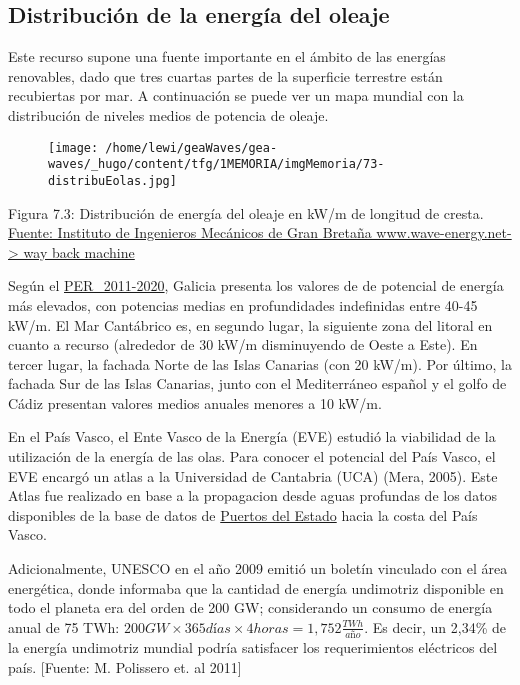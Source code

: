 \subsection{Distribución de la energía del oleaje}\label{header-n47}

Este recurso supone una fuente importante en el ámbito de las energías
renovables, dado que tres cuartas partes de la superficie terrestre
están recubiertas por mar. A continuación se puede ver un mapa mundial
con la distribución de niveles medios de potencia de oleaje.

\begin{figure}
\centering
\texttt{[image: /home/lewi/geaWaves/gea-waves/\_hugo/content/tfg/1MEMORIA/imgMemoria/73-distribuEolas.jpg]}
\caption{}
\end{figure}

Figura 7.3: Distribución de energía del oleaje en kW/m de longitud de
cresta.
\href{https://web.archive.org/web/20060127164948/http://www.wave-energy.net:80/home.htm}{Fuente:
Instituto de Ingenieros Mecánicos de Gran Bretaña
www.wave-energy.net-\textgreater{} way back machine}

Según el
\href{http://www.idae.es/uploads/documentos/documentos_PER_2011-2020_Borrador26julio-I_c53dc770.pdf}{PER\_2011-2020},
Galicia presenta los valores de de potencial de energía más elevados,
con potencias medias en profundidades indefinidas entre 40-45 kW/m. El
Mar Cantábrico es, en segundo lugar, la siguiente zona del litoral en
cuanto a recurso (alrededor de 30 kW/m disminuyendo de Oeste a Este). En
tercer lugar, la fachada Norte de las Islas Canarias (con 20 kW/m). Por
último, la fachada Sur de las Islas Canarias, junto con el Mediterráneo
español y el golfo de Cádiz presentan valores medios anuales menores a
10 kW/m.

En el País Vasco, el Ente Vasco de la Energía (EVE) estudió la
viabilidad de la utilización de la energía de las olas. Para conocer el
potencial del País Vasco, el EVE encargó un atlas a la Universidad de
Cantabria (UCA) (Mera, 2005). Este Atlas fue realizado en base a la
propagacion desde aguas profundas de los datos disponibles de la base de
datos de \href{www.puertos.es}{Puertos del Estado} hacia la costa del
País Vasco.

Adicionalmente, UNESCO en el año 2009 emitió un boletín vinculado con el
área energética, donde informaba que la cantidad de energía undimotriz
disponible en todo el planeta era del orden de 200 GW; considerando un
consumo de energía anual de 75 TWh:
\(200GW\times365 días\times4 horas=1,752 \frac {TWh}{año}\). Es decir,
un 2,34\% de la energía undimotriz mundial podría satisfacer los
requerimientos eléctricos del país. {[}Fuente: M. Polissero et. al
2011{]}

